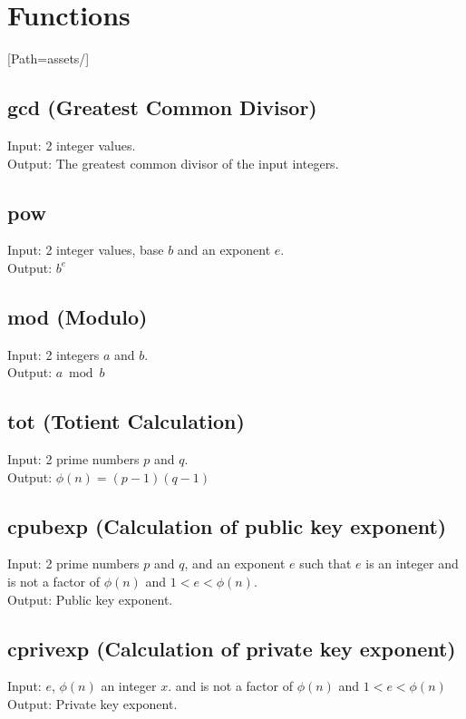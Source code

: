 \documentclass{article}
\begin{document}
\section{Functions}
\setmainfont{OpenSans-VariableFont_wdth,wght.ttf}[Path=assets/]
    \subsection{gcd (Greatest Common Divisor)}
    Input: 2 integer values.
    \\
    Output: The greatest common divisor of the input integers.
    \\
    \subsection{pow}
    Input: 2 integer values, base \(b\) and an exponent \(e\).
    \\
    Output: \(b^e\)
    \\
    \subsection{mod (Modulo)}
    Input: 2 integers \(a\) and \(b\).
    \\
    Output: \(a \bmod b\)
    \\
    \subsection{tot (Totient Calculation)}
    Input: 2 prime numbers \(p\) and \(q\).
    \\
    Output: \(\phi (n) = (p-1)(q-1)\)
    \\
    \subsection{cpubexp (Calculation of public key exponent)}
    Input: 2 prime numbers \(p\) and \(q\), and an exponent \(e\) such that \(e\) is an integer
    and is not a factor of \(\phi (n) \) and \(1 < e < \phi (n)\).
    \\
    Output: Public key exponent.
    \\
     \subsection{cprivexp (Calculation of private key exponent)}
    Input: \(e\), \(\phi (n)\) an integer \(x\).
    and is not a factor of \(\phi (n) \) and \(1 < e < \phi (n)\)
    \\
    Output: Private key exponent.
    \\
\end{document}
